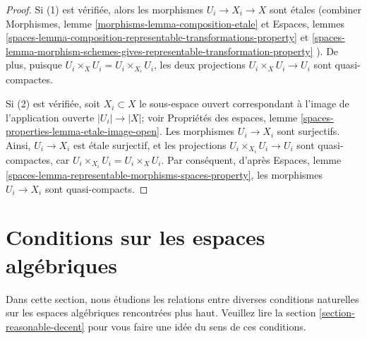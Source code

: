 \begin{proof}
Si (1) est vérifiée, alors les morphismes $U_i \to X_i \to X$ sont étales
(combiner Morphismes, lemme \ref{morphisms-lemma-composition-etale}
et
Espaces, lemmes
\ref{spaces-lemma-composition-representable-transformations-property} et
\ref{spaces-lemma-morphism-schemes-gives-representable-transformation-property}
).
De plus, puisque $U_i \times_X U_i = U_i \times_{X_i} U_i$,
les deux projections $U_i \times_X U_i \to U_i$ sont quasi-compactes.

\medskip\noindent
Si (2) est vérifiée, soit $X_i \subset X$ le sous-espace ouvert correspondant
à l'image de l'application ouverte $|U_i| \to |X|$; voir
Propriétés des espaces,
lemme \ref{spaces-properties-lemma-etale-image-open}.
Les morphismes $U_i \to X_i$ sont surjectifs.
Ainsi, $U_i \to X_i$ est étale surjectif, et les projections
$U_i \times_{X_i} U_i \to U_i$ sont quasi-compactes, car
$U_i \times_{X_i} U_i = U_i \times_X U_i$. Par conséquent, d'après
Espaces, lemme \ref{spaces-lemma-representable-morphisms-spaces-property},
les morphismes $U_i \to X_i$ sont quasi-compacts.
\end{proof}








\section{Conditions sur les espaces algébriques}
\label{section-conditions}

\noindent
Dans cette section, nous étudions les relations entre diverses conditions
naturelles sur les espaces algébriques rencontrées plus haut. Veuillez lire
la section \ref{section-reasonable-decent}
pour vous faire une idée du sens de ces conditions.

